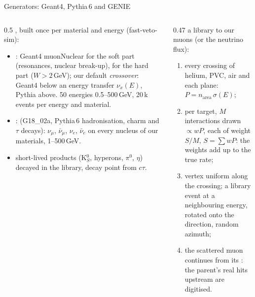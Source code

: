 \documentclass[aspectratio=169,10pt]{beamer}
\begin{document}
\begin{frame}{Generators: Geant4, Pythia\,6 and GENIE}
  \begin{columns}[T]
    \begin{column}{0.5\textwidth}\footnotesize
      , built once per material and energy (fast-veto-sim):
      \begin{itemize}\scriptsize
        \item {}: Geant4 muonNuclear for the soft part (resonances, nuclear break-up),  for the hard part ($W > 2$\,GeV); our default \emph{crossover}: Geant4 below an energy transfer $\nu_x(E)$, Pythia above. 50 energies 0.5--500\,GeV, 20\,k events per energy and material.
        \item {}:  (G18\_02a, Pythia\,6 hadronisation, charm and $\tau$ decays): $\nu_\mu$, $\bar\nu_\mu$, $\nu_e$, $\bar\nu_e$ on every nucleus of our materials, 1--500\,GeV.
        \item short-lived products (K$^0_S$, hyperons, $\pi^0$, $\eta$) decayed in the library, decay point from $c\tau$.
      \end{itemize}
    \end{column}
    \begin{column}{0.47\textwidth}\footnotesize
       a library to our muons (or the neutrino flux):
      \begin{enumerate}\scriptsize
        \item every crossing of helium, PVC, air and each plane: $P = n_\text{area}\,\sigma(E)$;
        \item per target,  $M$ interactions drawn $\propto wP$, each of weight $S/M$, $S = \sum wP$: the weights add up to the true rate;
        \item vertex uniform along the crossing; a library event at a neighbouring energy, rotated onto the direction, random azimuth;
        \item the scattered muon continues from its : the parent's real hits upstream are digitised.
      \end{enumerate}
    \end{column}
  \end{columns}
\end{frame}
\end{document}
